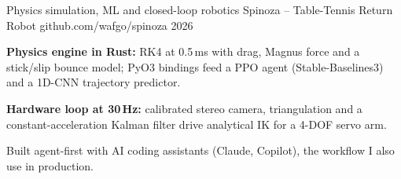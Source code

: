 

\begin{cventries}

  \cventry
    {Physics simulation, ML and closed-loop robotics} %
    {Spinoza -- Table-Tennis Return Robot} %
    {github.com/wafgo/spinoza} %
    {2026} %
    {
      \begin{cvitems}
        \item {\textbf{Physics engine in Rust:} RK4 at 0.5\,ms with drag, Magnus force and a stick/slip bounce model; PyO3 bindings feed a PPO agent (Stable-Baselines3) and a 1D-CNN trajectory predictor.}
        \item {\textbf{Hardware loop at 30\,Hz:} calibrated stereo camera, triangulation and a constant-acceleration Kalman filter drive analytical IK for a 4-DOF servo arm.}
        \item {Built agent-first with AI coding assistants (Claude, Copilot), the workflow I also use in production.}
      \end{cvitems}
    }

\end{cventries}
